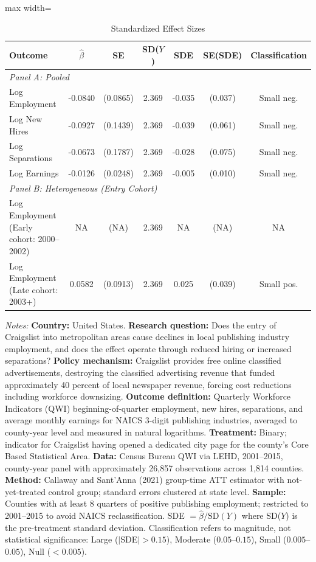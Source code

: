 \begin{table}[htbp]
\centering
\caption{Standardized Effect Sizes}
\label{tab:sde}
\begin{adjustbox}{max width=\textwidth}
\begin{threeparttable}
\begin{tabular}{lcccccc}
\toprule
Outcome & $\hat{\beta}$ & SE & SD($Y$) & SDE & SE(SDE) & Classification \\
\midrule
\multicolumn{7}{l}{\textit{Panel A: Pooled}} \\
Log Employment & -0.0840 & (0.0865) & 2.369 & -0.035 & (0.037) & Small neg. \\
Log New Hires & -0.0927 & (0.1439) & 2.369 & -0.039 & (0.061) & Small neg. \\
Log Separations & -0.0673 & (0.1787) & 2.369 & -0.028 & (0.075) & Small neg. \\
Log Earnings & -0.0126 & (0.0248) & 2.369 & -0.005 & (0.010) & Small neg. \\
\midrule
\multicolumn{7}{l}{\textit{Panel B: Heterogeneous (Entry Cohort)}} \\
Log Employment (Early cohort: 2000--2002) & NA & (NA) & 2.369 & NA & (NA) & NA \\
Log Employment (Late cohort: 2003+) & 0.0582 & (0.0913) & 2.369 & 0.025 & (0.039) & Small pos. \\
\bottomrule
\end{tabular}
\begin{tablenotes}[flushleft]
\footnotesize\raggedright
\item \textit{Notes:} \textbf{Country:} United States. \textbf{Research question:} Does the entry of Craigslist into metropolitan areas cause declines in local publishing industry employment, and does the effect operate through reduced hiring or increased separations? \textbf{Policy mechanism:} Craigslist provides free online classified advertisements, destroying the classified advertising revenue that funded approximately 40 percent of local newspaper revenue, forcing cost reductions including workforce downsizing. \textbf{Outcome definition:} Quarterly Workforce Indicators (QWI) beginning-of-quarter employment, new hires, separations, and average monthly earnings for NAICS 3-digit publishing industries, averaged to county-year level and measured in natural logarithms. \textbf{Treatment:} Binary; indicator for Craigslist having opened a dedicated city page for the county's Core Based Statistical Area. \textbf{Data:} Census Bureau QWI via LEHD, 2001--2015, county-year panel with approximately 26,857 observations across 1,814 counties. \textbf{Method:} Callaway and Sant'Anna (2021) group-time ATT estimator with not-yet-treated control group; standard errors clustered at state level. \textbf{Sample:} Counties with at least 8 quarters of positive publishing employment; restricted to 2001--2015 to avoid NAICS reclassification. SDE $= \hat{\beta} / \text{SD}(Y)$ where SD($Y$) is the pre-treatment standard deviation. Classification refers to magnitude, not statistical significance: Large ($|$SDE$| > 0.15$), Moderate ($0.05$--$0.15$), Small ($0.005$--$0.05$), Null ($< 0.005$).

\end{tablenotes}
\end{threeparttable}
\end{adjustbox}
\end{table}
